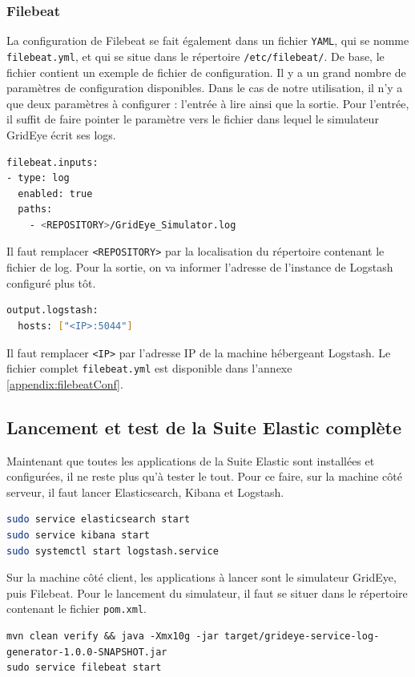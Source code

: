 \documentclass[paper=a4, fontsize=11pt]{scrartcl}
\begin{document}
\subsubsection{Filebeat}
La configuration de Filebeat se fait également dans un fichier \verb,YAML,, qui se nomme \verb,filebeat.yml,, et qui se situe dans le répertoire \verb,/etc/filebeat/,. De base, le fichier contient un exemple de fichier de configuration. Il y a un grand nombre de paramètres de configuration disponibles. Dans le cas de notre utilisation, il n'y a que deux paramètres à configurer : l'entrée à lire ainsi que la sortie.
Pour l'entrée, il suffit de faire pointer le paramètre vers le fichier dans lequel le simulateur GridEye écrit ses logs.
\begin{lstlisting}[language=bash]
filebeat.inputs:
- type: log
  enabled: true
  paths:
    - <REPOSITORY>/GridEye_Simulator.log
\end{lstlisting}
Il faut remplacer \verb,<REPOSITORY>, par la localisation du répertoire contenant le fichier de log.
Pour la sortie, on va informer l'adresse de l'instance de Logstash configuré plus tôt.
\begin{lstlisting}[language=bash]
output.logstash:
  hosts: ["<IP>:5044"]
\end{lstlisting}
Il faut remplacer \verb,<IP>, par l'adresse IP de la machine hébergeant Logstash.
Le fichier complet \verb,filebeat.yml, est disponible dans l'annexe \ref{appendix:filebeatConf}.

\subsection{Lancement et test de la Suite Elastic complète}
Maintenant que toutes les applications de la Suite Elastic sont installées et configurées, il ne reste plus qu'à tester le tout. Pour ce faire, sur la machine côté serveur, il faut lancer Elasticsearch, Kibana et Logstash.
\begin{lstlisting}[language=bash]
sudo service elasticsearch start
sudo service kibana start
sudo systemctl start logstash.service
\end{lstlisting}

Sur la machine côté client, les applications à lancer sont le simulateur GridEye, puis Filebeat. Pour le lancement du simulateur, il faut se situer dans le répertoire contenant le fichier \verb,pom.xml,.
\begin{lstlisting}
mvn clean verify && java -Xmx10g -jar target/grideye-service-log-generator-1.0.0-SNAPSHOT.jar
sudo service filebeat start
\end{lstlisting}
\end{document}
